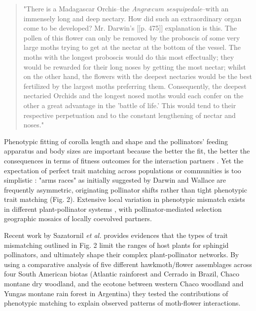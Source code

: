 \documentclass[a4paper,12pt]{article}
\begin{document}
\begin{spacing}{1.0}
	\begin{quotation}
	 "There is a Madagascar Orchis--the \textit{Angræcum sesquipedale}--with an immensely long and deep nectary. How did such an extraordinary organ come to be developed? Mr. Darwin's [[p. 475]] explanation is this. The pollen of this flower can only be removed by the proboscis of some very large moths trying to get at the nectar at the bottom of the vessel. The moths with the longest proboscis would do this most effectually; they would be rewarded for their long noses by getting the most nectar; whilst on the other hand, the flowers with the deepest nectaries would be the best fertilized by the largest moths preferring them. Consequently, the deepest nectaried Orchids and the longest nosed moths would each confer on the other a great advantage in the 'battle of life.' This would tend to their respective perpetuation and to the constant lengthening of nectar and noses."
	 \end{quotation}
 \end{spacing}
 
 Phenotypic fitting of corolla length and shape and the pollinators' feeding apparatus and body sizes are important because the better the fit, the better the consequences in terms of fitness outcomes for the interaction partners \citep{Nilsson:1988}. Yet the expectation of perfect trait matching across populations or communities is too simplistic \citep{Anderson:2010}: "arms races" as initially suggested by Darwin and Wallace are frequently asymmetric, originating pollinator shifts rather than tight phenotypic trait matching (Fig. 2). Extensive local variation in phenotypic mismatch exists in different plant-pollinator systems \citep[e.g., ][]{Cocucci:2009,Anderson:2010,More:2012}, with pollinator-mediated selection geographic mosaics of locally coevolved partners.

Recent work by Sazatornil \textit{et al.} \citep{Sazatornil:2016} provides evidences that the types of trait mismatching outlined in Fig. 2 limit the ranges of host plants for sphingid pollinators, and ultimately shape their complex plant-pollinator networks. By using a comparative analysis of five different hawkmoth/flower assemblages across four South American biotas (Atlantic rainforest and Cerrado in Brazil, Chaco montane dry woodland, and the ecotone between western Chaco woodland and Yungas montane rain forest in Argentina) they tested the contributions of phenotypic matching to explain observed patterns of moth-flower interactions. 
\end{document}
